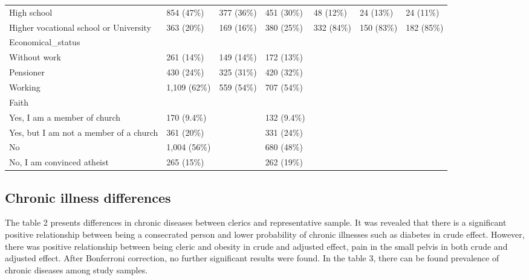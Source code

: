\documentclass[ijerph,article,accept,moreauthors,pdftex]{mdpi}
\begin{document}
\begin{table}
{\begin{tabular}[t]{lllllll}
\hspace{1em}High school & 854 (47\%) & 377 (36\%) & 451 (30\%) & 48 (12\%) & 24 (13\%) & 24 (11\%)\\
\hspace{1em}Higher vocational school or University & 363 (20\%) & 169 (16\%) & 380 (25\%) & 332 (84\%) & 150 (83\%) & 182 (85\%)\\
Economical\_status &  &  &  &  &  & \\
\addlinespace
\hspace{1em}Without work & 261 (14\%) & 149 (14\%) & 172 (13\%) &  &  & \\
\hspace{1em}Pensioner & 430 (24\%) & 325 (31\%) & 420 (32\%) &  &  & \\
\hspace{1em}Working & 1,109 (62\%) & 559 (54\%) & 707 (54\%) &  &  & \\
Faith &  &  &  &  &  & \\
\hspace{1em}Yes, I am a member of church & 170 (9.4\%) &  & 132 (9.4\%) &  &  & \\
\addlinespace
\hspace{1em}Yes, but I am not a member of a church & 361 (20\%) &  & 331 (24\%) &  &  & \\
\hspace{1em}No & 1,004 (56\%) &  & 680 (48\%) &  &  & \\
\hspace{1em}No, I am convinced atheist & 265 (15\%) &  & 262 (19\%) &  &  & \\
\bottomrule
\end{tabular}}
\end{table}

\newpage

\hypertarget{chronic-illness-differences}{%
\subsection{Chronic illness
differences}\label{chronic-illness-differences}}

The table 2 presents differences in chronic diseases between clerics and
representative sample. It was revealed that there is a significant
positive relationship between being a consecrated person and lower
probability of chronic illnesses such as diabetes in crude effect.
However, there was positive relationship between being cleric and
obesity in crude and adjusted effect, pain in the small pelvis in both
crude and adjusted effect. After Bonferroni correction, no further
significant results were found. In the table 3, there can be found
prevalence of chronic diseases among study samples.
\end{document}
